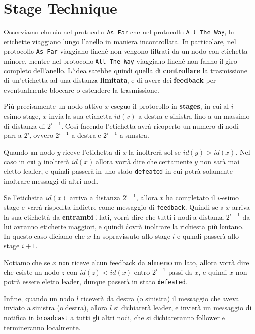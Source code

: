 \section{Stage Technique}

Osserviamo che sia nel protocollo \texttt{As Far} che nel protocollo \texttt{All The Way}, le etichette viaggiano lungo l'anello in maniera incontrollata. In particolare, nel protocollo \texttt{As Far} viaggiano finché non vengono filtrati da un nodo con etichetta minore, mentre nel protocollo \texttt{All The Way} viaggiano finché non fanno il giro completo dell'anello. L'idea sarebbe quindi quella di \textbf{controllare} la trasmissione di un'etichetta ad una distanza \textbf{limitata}, e di avere dei \textbf{feedback} per eventualmente bloccare o estendere la trasmissione.

Più precisamente un nodo attivo $x$ eseguo il protocollo in \textbf{stages}, in cui al $i$-esimo stage, $x$ invia la sua etichetta $id(x)$ a destra e sinistra fino a un massimo di distanza di $2^{i-1}$. Così facendo l'etichetta avrà ricoperto un numero di nodi pari a $2^i$, ovvero $2^{i-1}$ a destra e $2^{i-1}$ a sinistra. 

Quando un nodo $y$ riceve l'etichetta di $x$ la inoltrerà sol se $id(y) > id(x)$. Nel caso in cui $y$ inoltrerà $id(x)$ allora vorrà dire che certamente $y$ non sarà mai eletto leader, e quindi passerà in uno stato \texttt{defeated} in cui potrà solamente inoltrare messaggi di altri nodi.

Se l'etichetta $id(x)$ arriva a distanza $2^{i-1}$, allora $x$ ha completato il $i$-esimo stage e verrà rispedita indietro come messaggio di \texttt{feedback}. Quindi se a $x$ arriva la sua etichettà da \textbf{entrambi} i lati, vorrà dire che tutti i nodi a distanza $2^{i-1}$ da lui avranno etichette maggiori, e quindi dovrà inoltrare la richiesta più lontano. In questo caso diciamo che $x$ ha sopravissuto allo stage $i$ e quindi passerà allo stage $i + 1$.

Notiamo che se $x$ non riceve alcun feedback da \textbf{almeno} un lato, allora vorrà dire che esiste un nodo $z$ con $id(z) < id(x)$ entro $2^{i-1}$ passi da $x$, e quindi $x$ non potrà essere eletto leader, dunque passerà in stato \texttt{defeated}.

Infine, quando un nodo $l$ riceverà da destra (o sinistra) il messaggio che aveva inviato a sinistra (o destra), allora $l$ si dichiarerà leader, e invierà un messaggio di notifica in \texttt{broadcast} a tutti gli altri nodi, che si dichiareranno follower e termineranno localmente.

